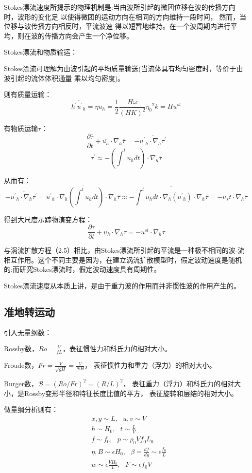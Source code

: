 \documentclass{article}
\begin{document}
Stokes漂流速度所揭示的物理机制是:当由波所引起的微团位移在波的传播方向时，波形的变化足
以使得微团的运动方向在相同的方向维持一段时间， 然而，当位移与波传播方向相反时，平流波速
得以短暂地维持。在一个波周期内进行平均，则在波的传播方向会产生一个净位移。

Stokes漂流和物质输运：

Stokes漂流可理解为由波引起的平均质量输送(当流体具有均匀密度时，等价于由波引起的流体体积通量 乘以均匀密度)。

则有质量运输：
$$\overline{h^{\prime}{{{{u}^{\prime}}}_{h}}}=\overline{\eta{{{u}}_{h}}}=\frac{1}{2}\frac{H\omega }{{{(HK)}^{2}}}{{\eta }_{0}}^{2}k=H{{u}^{st}}$$

有物质运输$\tau$：
$$\frac{\partial \overline{\tau }}{\partial t}+\overline{{{u}_{h}}}\cdot {{\nabla }_{h}}\overline{\tau }=-\overline{{{{{u}^{\prime}}}_{h}}\cdot {{\nabla }_{h}}\tau ^{\prime}}$$
$$\tau^{\prime}\approx-(\int^tu_hdt)\cdot{\nabla }_{h}\bar{\tau} $$

从而有：
$$-\overline{{{{{u}^{\prime}}}_{h}}\cdot {{\nabla }_{h}}\tau ^{\prime}} 
= \overline{{{{{u}^{\prime}}}_{h}}\cdot {{\nabla }_{h}}(\int^tu_hdt)\cdot{\nabla }_{h}\bar{\tau}}
\approx-\overline{\int^tu_hdt\cdot {{\nabla }_{h}}({{{{u}^{\prime}}}_{h}})\cdot{\nabla }_{h}\bar{\tau}}
=-u_st\cdot {{\nabla }_{h}}\bar{\tau}$$

得到大尺度示踪物演变方程：
$$\frac{\partial \tau }{\partial t}+{{u}_{h}}\cdot {{\nabla }_{h}}\tau =-{{u}^{st}}\cdot {{\nabla }_{h}}\tau$$

与涡流扩散方程（2.5）相比，由Stokes漂流所引起的平流是一种极不相同的波-流相互作用。这个不同主要是因为，在建立涡流扩散模型时，假定波动速度是随机的;而研究Stokes漂流时，假定波动速度具有周期性。

Stokes漂流速度从本质上讲，是由于重力波的作用而并非惯性波的作用产生的。

\subsection{准地转运动}
引入无量纲数：

Rossby数，$Ro=\frac{V}{fL}$，表征惯性力和科氏力的相对大小。

Froude数，$Fr = \frac{V}{\sqrt{gH}} = \frac{V}{NH}$，
表征惯性力和重力（浮力）的相对大小。

Burger数，$\mathcal{B} = (Ro/Fr)^2 = (R/L)^2$，
表征重力（浮力）和科氏力的相对大小，是Rossby变形半径和特征长度比值的平方，
表征旋转和层结的相对大小。

做量纲分析则有：
\begin{align}
&x,y\sim L, \ \ \ u,v\sim V \\ 
&h\sim H_0, \ \ \ t\sim \frac{L}{V}\\
&f\sim f_0, \ \ \ p\sim \rho_0Vf_0L_0\\
&\eta,B\sim \epsilon H_0, \ \ \ \beta=\frac{df}{dy}\sim \epsilon\frac{f_0}{L}\\
&w\sim \epsilon\frac{VH_0}{L}, \ \ \ F\sim \epsilon f_0V
\end{align}
\end{document}
